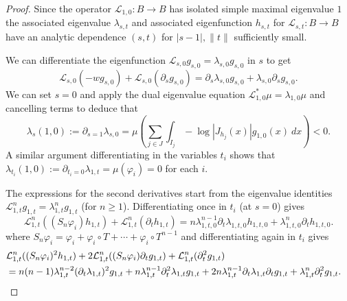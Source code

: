 \documentclass[12pt,a4paper,reqno]{amsart}
\begin{document}
\begin{proof}
Since the operator
$\mathcal L_{1,0} : B \to B$ has isolated  simple maximal eigenvalue $1$ the associated eigenvalue $\lambda_{s,t}$
and associated eigenfunction $h_{s,t}$
 for   $\mathcal L_{s,t} : B \to B$ have an analytic dependence $(s,t)$ for $|s-1|, \|t\|$ sufficiently small.
 
 We can differentiate the eigenfunction $\mathcal L_{s,0} g_{s,0} = \lambda_{s,0} g_{s,0}$  in $s$ to get
$$\mathcal L_{s,0}( -w g_{s,0}) + \mathcal L_{s,0}( \partial_sg_{s,0}) =  \partial_s \lambda_{s,0} g_{s,0}
+ \lambda_{s,0}   \partial_s g_{s,0}.
$$
We can set $s=0$ and apply the dual eigenvalue equation $\mathcal L_{1,0}^* \mu = \lambda_{1,0} \mu$
and cancelling terms
to deduce that 
$$
\lambda_s(1,0):= \partial_{s=1} \lambda_{s,0} =  \mu \left( \sum_{j \in J} \int_{I_j} -\log|J_{h_j}(x)| g_{1,0}(x) \ dx \right) < 0.
$$
A similar argument differentiating in the variables $t_i$ shows that $\lambda_{t_i}(1,0):=\partial_{t_i=0} \lambda_{1,t} = \mu (\varphi_i) = 0$ for each $i$.

The expressions for the second derivatives start from the eigenvalue identities $\mathcal L_{1,t}^n g_{1,t} = \lambda_{1,t}^n g_{1,t}$
(for $n \geq 1$).  Differentiating once in $t_i$ (at $s=0$) gives 
$$
\mathcal L_{1,t}^n( (S_n\varphi_i) h_{1,t}) + \mathcal L_{1,t}^n( \partial_th_{1,t}) =  
n  \lambda_{1,t,0}^{n-1} \partial_t \lambda_{1,t,0} h_{1,t,0}
+ \lambda_{1,t,0}^n   \partial_t h_{1,t,0}.
$$
where $S_n\varphi_i = \varphi_i + \varphi_i\circ T + \cdots + \varphi_i\circ T^{n-1}$
and  differentiating again  in $t_i$ gives 
$$
\begin{aligned}
&\mathcal L_{1,t}^n( (S_n\varphi_i)^2 h_{1,t})  
+ 2 \mathcal L_{1,t}^n( (S_n\varphi_i)
\partial_t
g_{1,t}) + \mathcal L_{1,t}^n( \partial_t^2g_{1,t})
\cr
&=  
n(n-1)  \lambda_{1,t}^{n-2} (\partial_t \lambda_{1,t})^2 g_{1,t}
+  n  \lambda_{1,t}^{n-1} \partial_t^2 \lambda_{1,t} g_{1,t}
+
2  n  \lambda_{1,t}^{n-1} \partial_t \lambda_{1,t} \partial_t g_{1,t}
+ \lambda_{1,t}^n   \partial_t^2 g_{1,t}.
\end{aligned}
$$


\end{proof}
\end{document}
